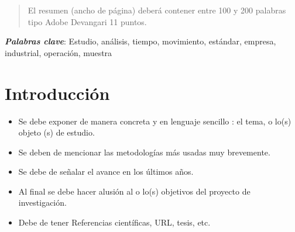     \maketitle
    \thispagestyle{fancy}
    
    
    
    \begin{abstract}
    \noindent 
    El resumen (ancho de página) deberá contener entre 100 y 200 palabras tipo Adobe Devangari 11 puntos.
    
    \end{abstract}
    \textbf{\textit{Palabras clave}}: { Estudio, análisis, tiempo, movimiento, estándar, empresa, industrial, operación, muestra }
    
    \section{Introducción}
    
    \begin{itemize}
        \item Se debe exponer de manera concreta y en lenguaje sencillo : el tema, o lo(s) objeto (s) de estudio. 
        \item Se deben de mencionar las metodologías más usadas muy brevemente. 
        \item Se debe de señalar el avance en los últimos años.
        \item Al final se debe hacer alusión al o lo(s) objetivos del proyecto de investigación.
        \item Debe de tener Referencias científicas, URL, tesis, etc.
    \end{itemize}
    
